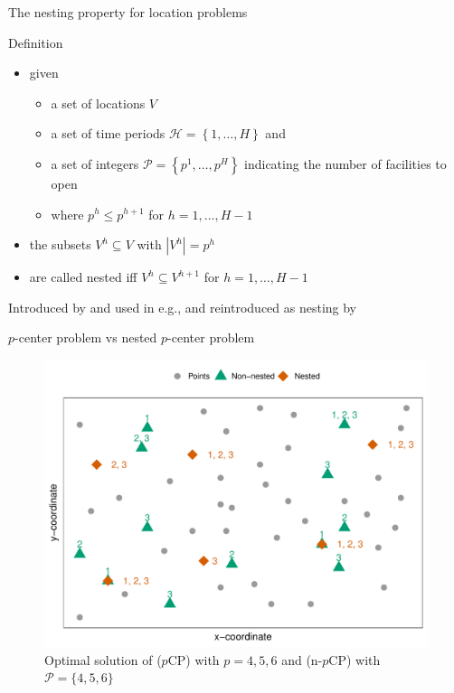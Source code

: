 \documentclass[utf8,aspectratio=1610,ngerman,english]{beamer}
\renewcommand{\emph}[1]{\textcolor{jkuGreen}{#1}}
\newcommand{\pCP}{($p$CP)\xspace}
\newcommand{\npCP}{(n-$p$CP)\xspace}
\begin{document}
\begin{frame}{The nesting property for location problems}
    \begin{block}{Definition}
        \begin{itemize}
            \item given
                  \begin{itemize}
                      \item a set of locations $V$ \pause
                      \item a set of time periods $\mathcal{H} = \left\{1, \dots, H\right\}$ and \pause
                      \item a set of integers $\mathcal P = \left\{p^1, \dots, p^H\right\}$ indicating the number of facilities to open \pause
                      \item where $p^h \leq p^{h+1}$ for $h = 1, \dots, H-1$ \pause
                  \end{itemize}
            \item the subsets $V^h \subseteq V$ with $|V^h| = p^h$ \pause
            \item are called \emph{nested} iff $V^h  \subseteq V^{h+1}$ for $h = 1, \dots, H-1$
        \end{itemize}
    \end{block}\pause
    Introduced by \citet{Roodman1975} and used in e.g., \citet{albareda2009multi,conforti2014integer,bakker2024value} and reintroduced as nesting by \citet{McGarvey2022}
\end{frame}

\begin{frame}{$p$-center problem vs nested $p$-center problem}
    \centering
    \begin{figure}
        \includegraphics[width=0.55\linewidth]{images/Rplot01.pdf}
        \caption{Optimal solution of \pCP with $p=4,5,6$ and \npCP with $\mathcal P = \{4,5,6\}$}
    \end{figure}
\end{frame}
\end{document}
